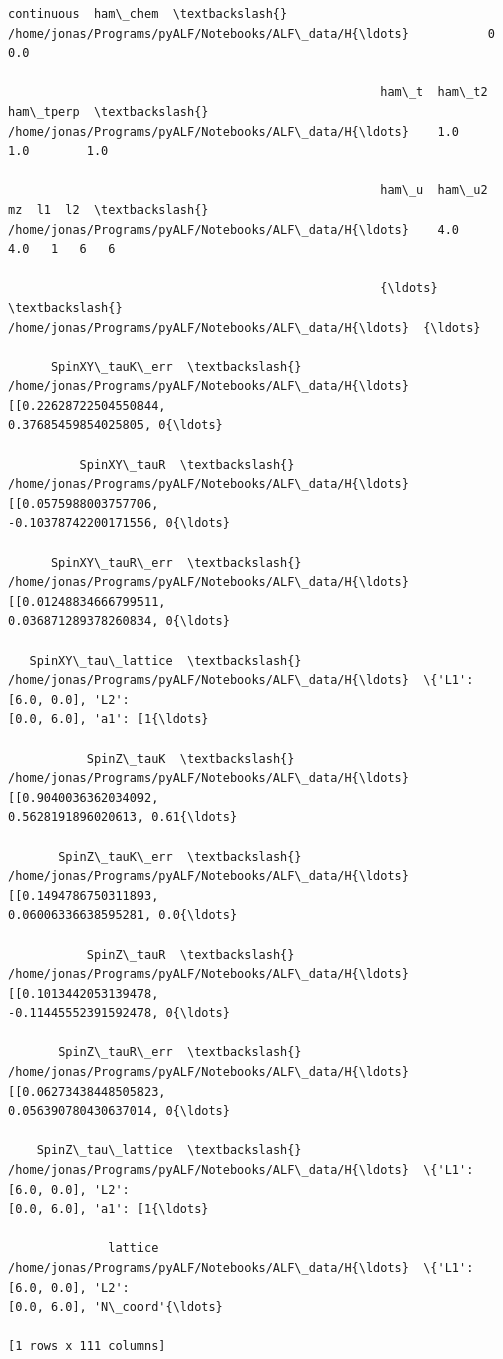 \documentclass[11pt]{article}
\makeatletter
\newcommand{\boxspacing}{\kern\kvtcb@left@rule\kern\kvtcb@boxsep}
\newcommand{\prompt}[4]{
        {\ttfamily\llap{{\color{#2}[#3]:\hspace{3pt}#4}}\vspace{-\baselineskip}}
    }
\makeatother
\begin{document}
            \begin{tcolorbox}[breakable, size=fbox, boxrule=.5pt, pad at break*=1mm, opacityfill=0]
\prompt{Out}{outcolor}{8}{\boxspacing}
\begin{Verbatim}[commandchars=\\\{\}]
                                                    continuous  ham\_chem  \textbackslash{}
/home/jonas/Programs/pyALF/Notebooks/ALF\_data/H{\ldots}           0       0.0

                                                    ham\_t  ham\_t2  ham\_tperp  \textbackslash{}
/home/jonas/Programs/pyALF/Notebooks/ALF\_data/H{\ldots}    1.0     1.0        1.0

                                                    ham\_u  ham\_u2  mz  l1  l2  \textbackslash{}
/home/jonas/Programs/pyALF/Notebooks/ALF\_data/H{\ldots}    4.0     4.0   1   6   6

                                                    {\ldots}  \textbackslash{}
/home/jonas/Programs/pyALF/Notebooks/ALF\_data/H{\ldots}  {\ldots}

      SpinXY\_tauK\_err  \textbackslash{}
/home/jonas/Programs/pyALF/Notebooks/ALF\_data/H{\ldots}  [[0.22628722504550844,
0.37685459854025805, 0{\ldots}

          SpinXY\_tauR  \textbackslash{}
/home/jonas/Programs/pyALF/Notebooks/ALF\_data/H{\ldots}  [[0.0575988003757706,
-0.10378742200171556, 0{\ldots}

      SpinXY\_tauR\_err  \textbackslash{}
/home/jonas/Programs/pyALF/Notebooks/ALF\_data/H{\ldots}  [[0.01248834666799511,
0.036871289378260834, 0{\ldots}

   SpinXY\_tau\_lattice  \textbackslash{}
/home/jonas/Programs/pyALF/Notebooks/ALF\_data/H{\ldots}  \{'L1': [6.0, 0.0], 'L2':
[0.0, 6.0], 'a1': [1{\ldots}

           SpinZ\_tauK  \textbackslash{}
/home/jonas/Programs/pyALF/Notebooks/ALF\_data/H{\ldots}  [[0.9040036362034092,
0.5628191896020613, 0.61{\ldots}

       SpinZ\_tauK\_err  \textbackslash{}
/home/jonas/Programs/pyALF/Notebooks/ALF\_data/H{\ldots}  [[0.1494786750311893,
0.06006336638595281, 0.0{\ldots}

           SpinZ\_tauR  \textbackslash{}
/home/jonas/Programs/pyALF/Notebooks/ALF\_data/H{\ldots}  [[0.1013442053139478,
-0.11445552391592478, 0{\ldots}

       SpinZ\_tauR\_err  \textbackslash{}
/home/jonas/Programs/pyALF/Notebooks/ALF\_data/H{\ldots}  [[0.06273438448505823,
0.056390780430637014, 0{\ldots}

    SpinZ\_tau\_lattice  \textbackslash{}
/home/jonas/Programs/pyALF/Notebooks/ALF\_data/H{\ldots}  \{'L1': [6.0, 0.0], 'L2':
[0.0, 6.0], 'a1': [1{\ldots}

              lattice
/home/jonas/Programs/pyALF/Notebooks/ALF\_data/H{\ldots}  \{'L1': [6.0, 0.0], 'L2':
[0.0, 6.0], 'N\_coord'{\ldots}

[1 rows x 111 columns]
\end{Verbatim}
\end{tcolorbox}
        
\end{document}
